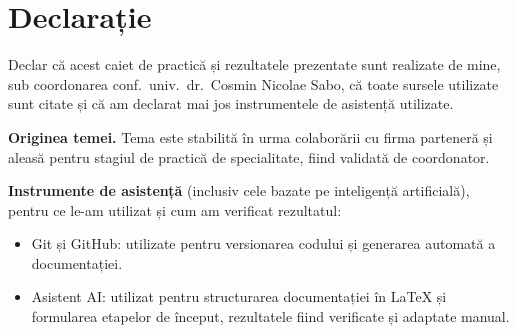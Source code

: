\chapter*{Declarație}
Declar că acest caiet de practică și rezultatele prezentate sunt realizate de mine, sub coordonarea
conf.~univ.~dr.~Cosmin Nicolae Sabo, că toate sursele utilizate sunt citate și că am declarat mai jos instrumentele
de asistență utilizate.

\textbf{Originea temei.} Tema este stabilită în urma colaborării cu firma parteneră și aleasă pentru stagiul de practică de specialitate, fiind validată de coordonator.

\textbf{Instrumente de asistență} (inclusiv cele bazate pe inteligență artificială), pentru ce le-am utilizat și cum am verificat rezultatul:
\begin{itemize}
  \item Git și GitHub: utilizate pentru versionarea codului și generarea automată a documentației.
  \item Asistent AI: utilizat pentru structurarea documentației în LaTeX și formularea etapelor de început, rezultatele fiind verificate și adaptate manual.
\end{itemize}